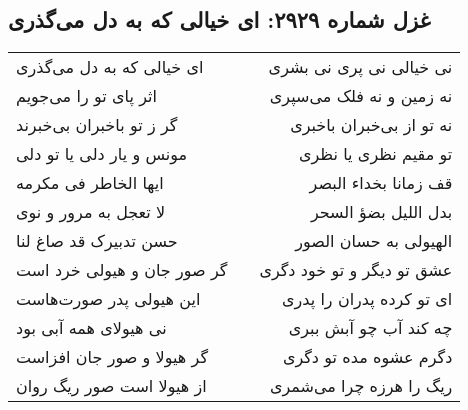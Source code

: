 \begin{center}
\section*{غزل شماره ۲۹۲۹: ای خیالی که به دل می‌گذری}
\label{sec:2929}
\begin{longtable}{l p{0.5cm} r}
ای خیالی که به دل می‌گذری
&&
نی خیالی نی پری نی بشری
\\
اثر پای تو را می‌جویم
&&
نه زمین و نه فلک می‌سپری
\\
گر ز تو باخبران بی‌خبرند
&&
نه تو از بی‌خبران باخبری
\\
مونس و یار دلی یا تو دلی
&&
تو مقیم نظری یا نظری
\\
ایها الخاطر فی مکرمه
&&
قف زمانا بخداء البصر
\\
لا تعجل به مرور و نوی
&&
بدل اللیل بضؤ السحر
\\
حسن تدبیرک قد صاغ لنا
&&
الهیولی به حسان الصور
\\
گر صور جان و هیولی خرد است
&&
عشق تو دیگر و تو خود دگری
\\
این هیولی پدر صورت‌هاست
&&
ای تو کرده پدران را پدری
\\
نی هیولای همه آبی بود
&&
چه کند آب چو آبش ببری
\\
گر هیولا و صور جان افزاست
&&
دگرم عشوه مده تو دگری
\\
از هیولا است صور ریگ روان
&&
ریگ را هرزه چرا می‌شمری
\\
\end{longtable}
\end{center}
